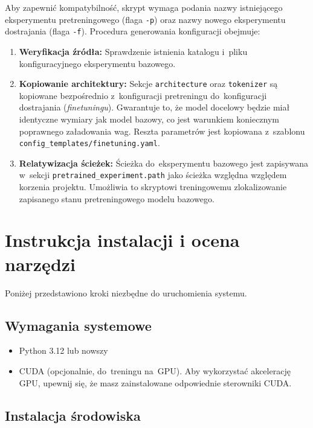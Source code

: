 \documentclass[a4paper,11pt,twoside]{report}
\theoremstyle{definition}
\begin{document}
Aby zapewnić kompatybilność, skrypt wymaga podania nazwy istniejącego eksperymentu pretreningowego (flaga \texttt{-p}) oraz nazwy nowego eksperymentu dostrajania (flaga \texttt{-f}). Procedura generowania konfiguracji obejmuje:
\begin{enumerate}
    \item \textbf{Weryfikacja źródła:} Sprawdzenie istnienia katalogu i~pliku konfiguracyjnego eksperymentu bazowego.
    \item \textbf{Kopiowanie architektury:} Sekcje \texttt{architecture} oraz \texttt{tokenizer} są kopiowane bezpośrednio z~konfiguracji pretreningu do~konfiguracji dostrajania (\emph{finetuningu}). Gwarantuje to, że model docelowy będzie miał identyczne wymiary jak model bazowy, co jest warunkiem koniecznym poprawnego załadowania wag. Reszta parametrów jest kopiowana z~szablonu \texttt{config\_templates/finetuning.yaml}.
    \item \textbf{Relatywizacja ścieżek:} Ścieżka do~eksperymentu bazowego jest zapisywana w~sekcji \texttt{pretrained\_experiment.path} jako ścieżka względna względem korzenia projektu. Umożliwia to skryptowi treningowemu zlokalizowanie zapisanego stanu pretreningowego modelu bazowego.
\end{enumerate}





\section{Instrukcja instalacji i ocena narzędzi}\label{sec:how-to-install}


Poniżej przedstawiono kroki niezbędne do uruchomienia systemu.

\subsection{Wymagania systemowe}

\begin{itemize}
    \item Python 3.12 lub nowszy
    \item CUDA (opcjonalnie, do~treningu na~GPU). Aby wykorzystać akcelerację GPU, upewnij się, że masz zainstalowane odpowiednie sterowniki CUDA.
\end{itemize}

\subsection{Instalacja środowiska}
\end{document}
